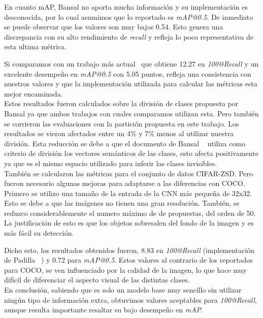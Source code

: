 En cuanto mAP, Bansal no aporta mucha información y su implementación es desconocida, por lo cual asumimos que lo reportado es \textit{mAP@0.5}. De inmediato se puede observar que los valores son muy bajos 0.54. Esto genera una discrepancia con su alto rendimiento de \textit{recall} y refleja lo poco representativa de esta ultima métrica. 

Si comparamos con un trabajo más actual~\cite{rahman2020zero} que obtiene 12.27 en \textit{100@Recall} y un excelente desempeño en \textit{mAP@0.5} con 5.05 puntos, refleja una consistencia con nuestros valores y que la implementación utilizada para calcular las métricas esta mejor encaminada.\\


Estos resultados fueron calculados sobre la división de clases propuesta por Bansal ya que ambos trabajos con cuales comparamos utilizan esta. Pero también se corrieron las evaluaciones con la partición propuesta en este trabajo. Los resultados se vieron afectados entre un 4\% y 7\% menos al utilizar nuestra división. Esta reducción se debe a que el documento de Bansal \etal~\cite{bansal2018zero} utiliza como criterio de división los vectores semánticos de las clases, esto afecta positivamente ya que es el mismo espacio utilizado para inferir las clases invisibles.\\

También se calcularon las métricas para el conjunto de datos CIFAR-ZSD. Pero fueron necesario algunas mejoras para adaptarse a las diferencias con COCO. Primero se utilizo una tamaño de la entrada de la CNN más pequeña de 32x32. Esto se debe a que las imágenes no tienen una gran resolución. También, se reduzco considerablemente el numero máximo de de propuestas, del orden de 50. La justificación de esto es que los objetos sobresalen del fondo de la imagen y es más fácil su detección.

Dicho esto, los resultados obtenidos fueron, 8.83 en \textit{100@Recall} (implementación de Padilla \etal~\cite{padilla2020survey}) y 0.72 para \textit{mAP@0.5}. Estos valores al contrario de los reportados para COCO, se ven influenciado por la calidad de la imagen, lo que hace muy difícil de diferenciar el aspecto visual de las distintas clases.\\

En conclusión, sabiendo que es solo un modelo base muy sencillo sin utilizar ningún tipo de información extra, obtuvimos valores aceptables para \textit{100@Recall}, aunque resulta importante resaltar su bajo desempeño en \textit{mAP}. 

